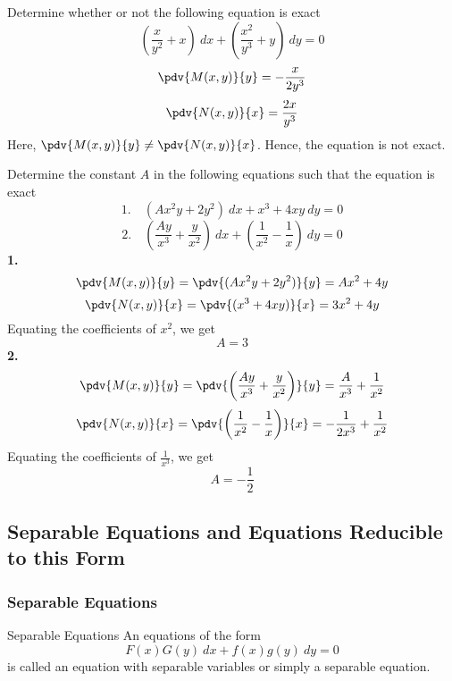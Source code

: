 \begin{example}{
    Determine whether or not the following equation is exact
    \[ \left(\dfrac{x}{y^2} + x\right) \: d{x} + \left(\dfrac{x^2}{y^3} + y\right) \: d{y} = 0 \]
    }{}
    \[ \pdv{M(x,y)}{y} = -\frac{x}{2y^3} \]
    \[ \pdv{N(x,y)}{x} = \frac{2x}{y^3} \]
    Here, $\pdv{M(x,y)}{y} \neq \pdv{N(x,y)}{x}$. Hence, the equation is not exact.
\end{example}

\begin{example}{Determine the constant $A$ in the following equations such that the equation is exact
    \begin{equation*} 1.\quad
        (Ax^2y + 2y^2) \: d{x} + x^3 + 4xy \: d{y} = 0
    \end{equation*}
    \begin{equation*} 2.\quad
        \left( \frac{Ay}{x^3} + \frac{y}{x^2} \right) \: d{x} + \left( \frac{1}{x^2} - \frac{1}{x} \right) \: d{y} = 0
    \end{equation*}
}{}
    \textbf{1.}
    \[ \pdv{M(x,y)}{y} = \pdv{(Ax^2y + 2y^2)}{y} = Ax^2 + 4y \]
    \[ \pdv{N(x,y)}{x} = \pdv{(x^3 + 4xy)}{x} = 3x^2 + 4y \]
    Equating the coefficients of $x^2$, we get \[
        \boxed{A=3}
    \]
    \textbf{2.}
    \[ \pdv{M(x,y)}{y} = \pdv{ \left( \frac{Ay}{x^3} + \frac{y}{x^2} \right) }{y} = \frac{A}{x^3} + \frac{1}{x^2} \]
    \[ \pdv{N(x,y)}{x} = \pdv{ \left( \frac{1}{x^2} - \frac{1}{x} \right) }{x} = -\frac{1}{2x^3} + \frac{1}{x^2} \]
    Equating the coefficients of $\frac{1}{x^3}$, we get \[
        \boxed{A = -\frac{1}{2}}
    \]
\end{example}



\subsection{Separable Equations and Equations Reducible to this Form}


\subsubsection{Separable Equations}

\begin{definition}{Separable Equations}{}
    An equations of the form
    \begin{equation}
        F(x)G(y) \: d{x} + f(x)g(y) \: d{y} = 0
    \end{equation}
    is called an equation with separable variables or simply a separable equation.
\end{definition}

